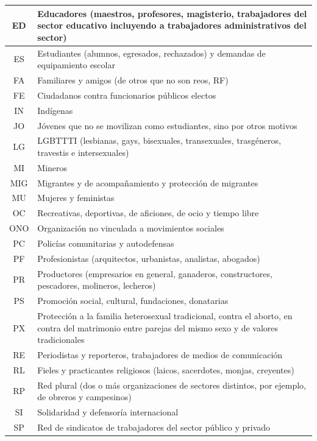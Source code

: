 \documentclass[letterpaper, 11pt]{book}
\theoremstyle{definition}
\theoremstyle{remark}
\begin{document}
{{{{{{{{{{\begin{footnotesize}
\begin{longtable}{|@{ }c|p{14cm}@{ }|}
\hline
ED & Educadores (maestros, profesores, magisterio, trabajadores del sector educativo incluyendo a trabajadores administrativos del sector)\\
\hline
ES & Estudiantes (alumnos, egresados, rechazados) y demandas de equipamiento escolar\\
\hline
FA & Familiares y amigos (de otros que no son reos, RF)\\
\hline
FE & Ciudadanos contra funcionarios públicos electos\\
\hline
IN & Indígenas\\
\hline
JO & Jóvenes que no se movilizan como estudiantes, sino por otros motivos\\
\hline
LG & LGBTTTI (lesbianas, gays, bisexuales, transexuales, trasgéneros, travestis e intersexuales)\\
\hline
MI & Mineros\\
\hline
MIG & Migrantes y de acompañamiento y protección de migrantes\\
\hline
MU & Mujeres y feministas\\
\hline
OC & Recreativas, deportivas, de aficiones, de ocio y tiempo libre\\
\hline
ONO & Organización no vinculada a movimientos sociales\\
\hline
PC & Policías comunitarias y autodefensas\\
\hline
PF & Profesionistas (arquitectos, urbanistas, analistas, abogados)\\
\hline
PR & Productores (empresarios en general, ganaderos, constructores, pescadores, molineros, lecheros)\\
\hline
PS & Promoción social, cultural, fundaciones, donatarias\\
\hline
PX & Protección a la familia heterosexual tradicional, contra el aborto, en contra del matrimonio entre parejas del mismo sexo y de valores tradicionales\\
\hline
RE & Periodistas y reporteros, trabajadores de medios de comunicación\\
\hline
RL & Fieles y practicantes religiosos (laicos, sacerdotes, monjas, creyentes)\\
\hline
RP & Red plural (dos o más organizaciones de sectores distintos, por ejemplo, de obreros y campesinos)\\
\hline
SI & Solidaridad y defensoría internacional\\
\hline
SP & Red de sindicatos de trabajadores del sector público y privado\\

\end{longtable}
\end{footnotesize}}}}}}}}}}}
\end{document}
